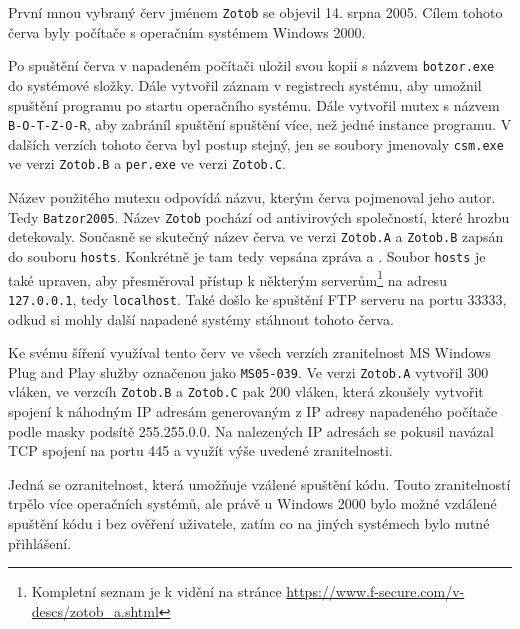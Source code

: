 \documentclass[a4paper,12pt]{article}
\begin{document}
První mnou vybraný červ jménem \texttt{Zotob} se objevil 14. srpna 2005\cite{wiki-timeline}\cite{zotob-schneider}. Cílem tohoto červa byly počítače s operačním systémem Windows 2000\cite{zotob-fsecure}.

Po spuštění červa v napadeném počítači uložil svou kopii s názvem \texttt{botzor.exe} do systémové složky\cite{zotob-fsecure}. Dále vytvořil záznam v registrech systému, aby umožnil spuštění programu po startu operačního systému. Dále vytvořil mutex s názvem \texttt{B-O-T-Z-O-R}, aby zabráníl spuštění spuštění více, než jedné instance programu. V dalších verzích tohoto červa byl postup stejný, jen se soubory jmenovaly \texttt{csm.exe} ve verzi \texttt{Zotob.B} a \texttt{per.exe} ve verzi \texttt{Zotob.C}.

Název použitého mutexu odpovídá názvu, kterým červa pojmenoval jeho autor. Tedy \texttt{Batzor2005}. Název \texttt{Zotob} pochází od antivirových společností, které hrozbu detekovaly\cite{zotob-wikidot}. Současně se skutečný název červa ve verzi \texttt{Zotob.A} a \texttt{Zotob.B} zapsán do souboru \texttt{hosts}. Konkrétně je tam tedy vepsána zpráva  a \cite{zotob-fsecure}. Soubor \texttt{hosts} je také upraven, aby přesměroval přístup k některým serverům\footnote{Kompletní seznam je k vidění na stránce \url{https://www.f-secure.com/v-descs/zotob_a.shtml}} na adresu \texttt{127.0.0.1}, tedy \texttt{localhost}\cite{zotob-fsecure}. Také došlo ke spuštění FTP serveru na portu 33333, odkud si mohly další napadené systémy stáhnout tohoto červa\cite{zotob-fsecure}.

Ke svému šíření využíval tento červ ve všech verzích zranitelnost MS Windows Plug and Play služby označenou jako \texttt{MS05-039}\cite{zotob-fsecure}. Ve verzi \texttt{Zotob.A} vytvořil 300 vláken, ve verzcíh \texttt{Zotob.B} a \texttt{Zotob.C} pak 200 vláken, která zkoušely vytvořit spojení k náhodným IP adresám generovaným z IP adresy napadeného počítače podle masky podsítě 255.255.0.0\cite{zotob-fsecure}\cite{zotobb-fsecure}\cite{zotobc-fsecure}. Na nalezených IP adresách se pokusil navázal TCP spojení na portu 445 a využít výše uvedené zranitelnosti.

Jedná se ozranitelnost, která umožňuje vzálené spuštění kódu. Touto zranitelností trpělo více operačních systémů, ale právě u Windows 2000 bylo možné vzdálené spuštění kódu i bez ověření uživatele, zatím co na jiných systémech bylo nutné přihlášení\cite{zotob-ms}\cite{zotob-msbulletin}.
\end{document}
